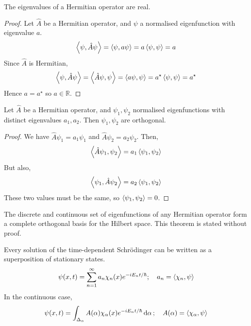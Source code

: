 \begin{theorem}
	The eigenvalues of a Hermitian operator are real.
\end{theorem}
\begin{proof}
	Let \( \hat A \) be a Hermitian operator, and \( \psi \) a normalised eigenfunction with eigenvalue \( a \).
	\[
		\left\langle{\psi, \hat A \psi}\right\rangle = \left\langle{\psi, a \psi}\right\rangle = a \left\langle{\psi, \psi}\right\rangle = a
	\]
	Since \( \hat A \) is Hermitian,
	\[
		\left\langle{\psi, \hat A \psi}\right\rangle = \left\langle{\hat A \psi, \psi}\right\rangle = \left\langle{a \psi, \psi}\right\rangle = a^\star \left\langle{\psi, \psi}\right\rangle = a^\star
	\]
	Hence \( a = a^\star \) so \( a \in \mathbb R \).
\end{proof}
\begin{theorem}
	Let \( \hat A \) be a Hermitian operator, and \( \psi_1, \psi_2 \) normalised eigenfunctions with distinct eigenvalues \( a_1, a_2 \).
	Then \( \psi_1, \psi_2 \) are orthogonal.
\end{theorem}
\begin{proof}
	We have \( \hat A \psi_1 = a_1 \psi_1 \) and \( \hat A \psi_2 = a_2 \psi_2 \).
	Then,
	\[
		\left\langle{\hat A \psi_1, \psi_2}\right\rangle = a_1 \left\langle{\psi_1, \psi_2}\right\rangle
	\]
	But also,
	\[
		\left\langle{\psi_1, \hat A \psi_2}\right\rangle = a_2 \left\langle{\psi_1, \psi_2}\right\rangle
	\]
	These two values must be the same, so \( \left\langle{\psi_1, \psi_2}\right\rangle = 0 \).
\end{proof}
\begin{theorem}
	The discrete and continuous set of eigenfunctions of any Hermitian operator form a complete orthogonal basis for the Hilbert space.
	This theorem is stated without proof.
\end{theorem}
\begin{corollary}
	Every solution of the time-dependent Schr\"odinger can be written as a superposition of stationary states.
	\[
		\psi(x, t) = \sum_{n=1}^\infty a_n \chi_n(x) e^{-iE_nt/\hbar};\quad a_n = \left\langle{\chi_n, \psi}\right\rangle
	\]
	In the continuous case,
	\[
		\psi(x, t) = \int_{\Delta_\alpha} A(\alpha) \chi_\alpha(x) e^{-iE_nt/\hbar} \dd{\alpha};\quad A(\alpha) = \left\langle{\chi_\alpha, \psi}\right\rangle
	\]
\end{corollary}

